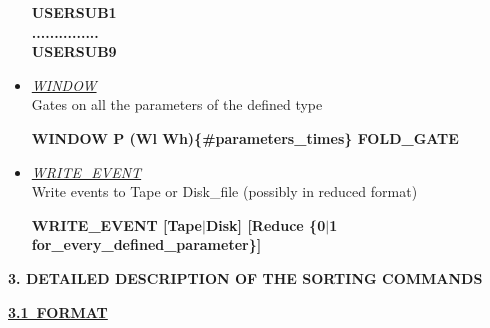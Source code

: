 \begin{itemize}
	\smallskip
	{\bf USERSUB1 \\
	............... \\
	USERSUB9}

 \item	{\it\underline{WINDOW}} \\
	{\sc Gates on all the parameters of the defined type }

	\smallskip
	{\bf WINDOW P (Wl Wh)\{\#parameters\_times\} FOLD\_GATE} \\
	

 \item	{\it\underline{WRITE\_EVENT}} \\
	{\sc Write events to Tape or Disk\_file (possibly in reduced format)}

	\smallskip
	{\bf WRITE\_EVENT [Tape$|$Disk]  [Reduce \{0$|$1 
	for\_every\_defined\_parameter\}]} \\

\end{itemize}



\newpage
\noindent
{\large\bf 3. DETAILED DESCRIPTION OF THE SORTING COMMANDS} \\

\bigskip
\bigskip     

{\large\underline{\bf 3.1~FORMAT}} \\

